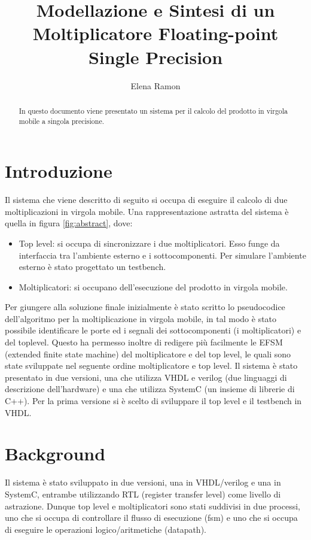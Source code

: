 \documentclass[]{IEEEtran}
\title{Modellazione e Sintesi di un Moltiplicatore Floating-point Single Precision}
\author{Elena Ramon}
\begin{document}
\maketitle

\begin{abstract}
In questo documento viene presentato un sistema per il calcolo del prodotto in virgola mobile a singola precisione.
\end{abstract}

\section{Introduzione}

Il sistema che viene descritto di seguito si occupa di eseguire il calcolo di due moltiplicazioni in virgola mobile. Una rappresentazione astratta del sistema è quella in figura \ref{fig:abstract}, dove:
\begin{itemize}
    \item Top level: si occupa di sincronizzare i due moltiplicatori. Esso funge da interfaccia tra l’ambiente esterno e i sottocomponenti. Per simulare l’ambiente esterno è stato progettato un testbench. 
    
    \item Moltiplicatori: si occupano dell'esecuzione del prodotto in virgola mobile. 
\end{itemize}

Per giungere alla soluzione finale inizialmente è stato scritto lo pseudocodice dell’algoritmo per la moltiplicazione in virgola mobile, in tal modo è stato possibile identificare le porte ed i segnali dei sottocomponenti (i moltiplicatori) e del toplevel. Questo ha permesso inoltre di redigere più facilmente le EFSM (extended finite state machine) del moltiplicatore e del top level, le quali sono state sviluppate nel seguente ordine moltiplicatore e top level. Il sistema è stato presentato in due versioni, una che utilizza VHDL e verilog (due linguaggi di descrizione dell’hardware) e una che utilizza SystemC (un insieme di librerie di C++). Per la prima versione si è scelto di sviluppare il top level e il testbench in VHDL.

\section{Background}
Il sistema è stato sviluppato in due versioni, una in VHDL/verilog e una in SystemC, entrambe utilizzando RTL (register transfer level) come livello di astrazione. Dunque top level e moltiplicatori sono stati suddivisi in due processi, uno che si occupa di controllare il flusso di esecuzione (fsm) e uno che si occupa di eseguire le operazioni logico/aritmetiche (datapath).
\end{document}
